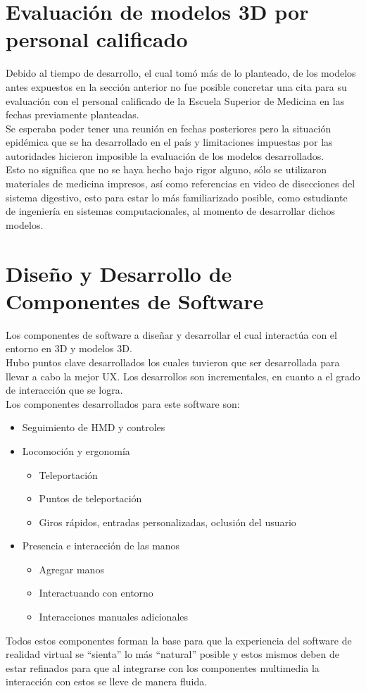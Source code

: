 \section{Evaluación de modelos 3D por personal calificado}
Debido al tiempo de desarrollo, el cual tomó más de lo planteado, de los modelos antes expuestos en la sección anterior no fue posible concretar una cita 
para su evaluación con el personal calificado  de la Escuela Superior de Medicina en las fechas previamente planteadas.\\
Se esperaba poder tener una reunión en fechas posteriores pero la situación epidémica que se ha desarrollado en el país y 
limitaciones impuestas por las autoridades hicieron imposible la evaluación de los modelos desarrollados.\\
Esto no significa que no se haya hecho bajo rigor alguno, sólo se utilizaron materiales de medicina impresos, así como 
referencias en video de disecciones del sistema digestivo, esto para estar lo más familiarizado posible, como estudiante 
de ingeniería en sistemas computacionales, al momento de desarrollar dichos modelos.\\

\section{Diseño y Desarrollo de Componentes de Software}
Los componentes de software a diseñar y desarrollar el cual interactúa con el entorno en 3D y  modelos 3D.\\
Hubo puntos clave desarrollados los cuales tuvieron que ser desarrollada para llevar a cabo la mejor UX. Los desarrollos son incrementales, en cuanto a el grado de interacción 
que se logra.\\
Los componentes desarrollados para este software son:\\
\begin{itemize}
  \item Seguimiento de HMD y controles
  \item Locomoción y ergonomía
  \begin{itemize}
    \item Teleportación
    \item Puntos de teleportación
    \item Giros rápidos, entradas personalizadas, oclusión del usuario    
  \end{itemize}
  \item Presencia e interacción de las manos  
  \begin{itemize}
    \item Agregar manos
    \item Interactuando con entorno
    \item Interacciones manuales adicionales    
  \end{itemize}
\end{itemize}
Todos estos componentes forman la base para que la experiencia del software de realidad virtual se “sienta” lo más “natural” posible y estos mismos deben de estar refinados para que 
al integrarse con los componentes multimedia la interacción con estos se lleve de manera fluida.

